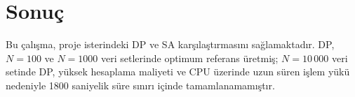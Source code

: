 \documentclass[conference,a4paper]{IEEEtran}
\begin{document}
\FloatBarrier

\section{Sonuç}

Bu çalışma, proje isterindeki DP ve SA karşılaştırmasını sağlamaktadır. DP, $N{=}100$ ve $N{=}1000$ veri setlerinde optimum referans üretmiş; $N=10\,000$ veri setinde DP, yüksek hesaplama maliyeti ve CPU üzerinde uzun süren işlem yükü nedeniyle 1800 saniyelik süre sınırı içinde tamamlanamamıştır.

\vspace{-6pt}


\end{document}
